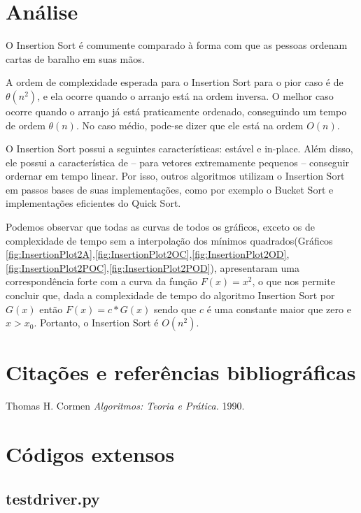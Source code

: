 \documentclass[12pt,a4paper,twoside]{report}
\begin{document}
\chapter{Análise}

O Insertion Sort é comumente comparado à forma com que as pessoas ordenam cartas de baralho em suas mãos.

A ordem de complexidade esperada para o Insertion Sort para o pior caso é de $\theta (n^2)$, e ela ocorre quando o arranjo está na ordem inversa. O melhor caso ocorre quando o arranjo já está praticamente ordenado, conseguindo um tempo de ordem $\theta (n)$. No caso médio, pode-se dizer que ele está na ordem $O(n)$.

O Insertion Sort possui a seguintes características: estável e in-place. Além disso, ele possui a característica de – para vetores extremamente pequenos – conseguir ordernar em tempo linear. Por isso, outros algoritmos utilizam o Insertion Sort em passos bases de suas implementações, como por exemplo o Bucket Sort e implementações eficientes do Quick Sort.

Podemos observar que todas as curvas de todos os gráficos, exceto os de complexidade de tempo sem a interpolação dos mínimos quadrados(Gráficos \ref{fig:InsertionPlot2A},\ref{fig:InsertionPlot2OC},\ref{fig:InsertionPlot2OD},\ref{fig:InsertionPlot2POC},\ref{fig:InsertionPlot2POD}), apresentaram uma correspondência forte com a curva da função $F(x) = x^2$, o que nos permite concluir que, dada a complexidade de tempo do algoritmo Insertion Sort por $G(x)$ então $F(x) = c * G(x)$ sendo que $c$ é uma constante maior que zero e $x > x_0$. Portanto, o Insertion Sort é $O(n^2)$.

\chapter{Citações e referências bibliográficas}
	\begin{thebibliography}{1}
		
		 Thomas H. Cormen {\em 
			Algoritmos: Teoria e Prática.
		}  1990.
		
	\end{thebibliography}







\clearpage
{}
\appendix

\chapter{Códigos extensos \label{ap:testdriver}}
\section{testdriver.py}

\end{document}
